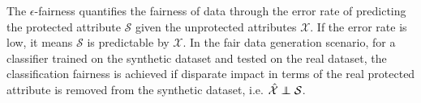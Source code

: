 \documentclass[sigconf]{acmart}
\theoremstyle{definition}
\newtheorem{definition}{Definition}
\newcommand\independent{\protect\mathpalette{\protect\independenT}{\perp}}
\def\independenT#1#2{\mathrel{\rlap{$#1#2$}\mkern2mu{#1#2}}}
\begin{document}
The $\epsilon$-fairness quantifies the fairness of data through the error rate of predicting the protected attribute $\mathcal{S}$ given the unprotected attributes $\mathcal{X}$. If the error rate is low, it means $\mathcal{S}$ is predictable by $\mathcal{X}$. 
In the fair data generation scenario, for a classifier trained on the synthetic dataset and tested on the real dataset,
the classification fairness is achieved if  disparate impact in terms of the real protected attribute is removed from the synthetic dataset, i.e. $\hat{\mathcal{X}}\independent \mathcal{S}$. 






\end{document}

